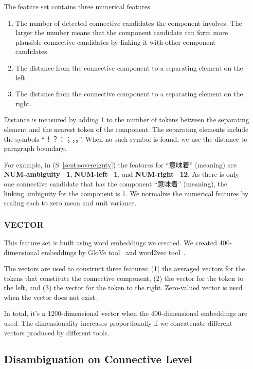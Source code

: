 The feature set contains three numerical features.

\begin{enumerate}
    \item The number of detected connective candidates the component involves. The larger
        the number means that the component candidate can form more plausible connective
        candidates by linking it with other component candidates.
    \item The distance from the connective component to a separating element on the left.
    \item The distance from the connective component to a
        separating element on the right.
\end{enumerate}

Distance is measured by adding 1 to the number of tokens
between the separating element and the nearest token of the component.
The separating elements include the symbols ``！？：；，。''.
When no such symbol is found, we use the distance to paragraph boundary.

For example, in (S~\ref{sent:sovereignty}) the features for “意味着” (meaning) are \textbf{NUM-ambiguity=1},
\textbf{NUM-left=1}, and \textbf{NUM-right=12}. As there is only one connective candidate that has the
component “意味着” (meaning), the linking ambiguity for the component is 1.
We normalize the numerical features by scaling each to zero mean and unit variance.


\subsubsection{VECTOR}

This feature set is built using word embeddings we created.
We created 400-dimensional embeddings by GloVe tool~\citep{pennington2014glove}
and word2vec tool~\citep{mikolov2013efficient,mikolov2013distributed}.

The vectors are used to construct three features: (1) the averaged vectors
for the tokens that constitute the connective component, (2) the vector for the
token to the left, and (3) the vector for the token to the right. Zero-valued vector is used
when the vector does not exist.

In total, it's a 1200-dimensional vector when the 400-dimensional embeddings are used.
The dimensionality increases proportionally if we concatenate different vectors produced by
different tools.

\subsection{Disambiguation on Connective Level}
\label{s:discourse-disambig-connective}


